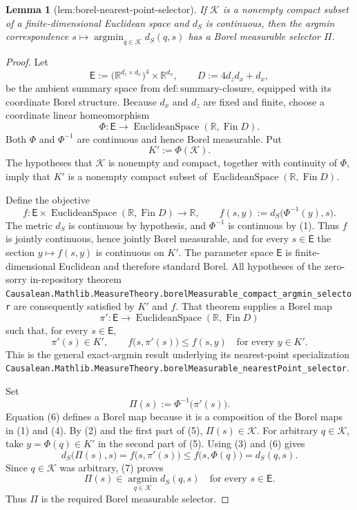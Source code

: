 \documentclass{article}
\newtheorem{lemma}{Lemma}
\begin{document}
\begin{lemma}[lem:borel-nearest-point-selector]\label{lem:borel-nearest-point-selector}
If \(\mathcal K\) is a nonempty compact subset of a finite-dimensional Euclidean space and \(d_S\) is continuous, then the argmin correspondence \(s\mapsto\operatorname*{argmin}_{q\in\mathcal K}d_S(q,s)\) has a Borel measurable selector \(\Pi\).
\end{lemma}
\begin{proof}
Let
\[
\mathsf E:=\bigl(\mathbb R^{d_z\times d_x}\bigr)^4\times\mathbb R^{d_x},
\qquad D:=4d_zd_x+d_x,
\]
be the ambient summary space from \(\mathrm{def:summary\text{-}closure}\), equipped with its coordinate Borel structure.  Because \(d_x\) and \(d_z\) are fixed and finite, choose a coordinate linear homeomorphism
\[
\Phi:\mathsf E\longrightarrow \operatorname{EuclideanSpace}(\mathbb R,\operatorname{Fin}D).
\tag{1}
\]
Both \(\Phi\) and \(\Phi^{-1}\) are continuous and hence Borel measurable.  Put
\[
K':=\Phi(\mathcal K).
\tag{2}
\]
The hypotheses that \(\mathcal K\) is nonempty and compact, together with continuity of \(\Phi\), imply that \(K'\) is a nonempty compact subset of \(\operatorname{EuclideanSpace}(\mathbb R,\operatorname{Fin}D)\).

Define the objective
\[
f:\mathsf E\times\operatorname{EuclideanSpace}(\mathbb R,\operatorname{Fin}D)
\longrightarrow\mathbb R,
\qquad
f(s,y):=d_S\bigl(\Phi^{-1}(y),s\bigr).
\tag{3}
\]
The metric \(d_S\) is continuous by hypothesis, and \(\Phi^{-1}\) is continuous by (1).  Thus \(f\) is jointly continuous, hence jointly Borel measurable, and for every \(s\in\mathsf E\) the section \(y\mapsto f(s,y)\) is continuous on \(K'\).  The parameter space \(\mathsf E\) is finite-dimensional Euclidean and therefore standard Borel.  All hypotheses of the zero-sorry in-repository theorem
\texttt{Causalean.Mathlib.MeasureTheory.borelMeasurable\_compact\_argmin\_selector}
are consequently satisfied by \(K'\) and \(f\).  That theorem supplies a Borel map
\[
\pi':\mathsf E\longrightarrow\operatorname{EuclideanSpace}(\mathbb R,\operatorname{Fin}D)
\tag{4}
\]
such that, for every \(s\in\mathsf E\),
\[
\pi'(s)\in K',
\qquad
f\bigl(s,\pi'(s)\bigr)\le f(s,y)
\quad\text{for every }y\in K'.
\tag{5}
\]
This is the general exact-argmin result underlying its nearest-point specialization
\texttt{Causalean.Mathlib.MeasureTheory.borelMeasurable\_nearestPoint\_selector}.

Set
\[
\Pi(s):=\Phi^{-1}\bigl(\pi'(s)\bigr).
\tag{6}
\]
Equation (6) defines a Borel map because it is a composition of the Borel maps in (1) and (4).  By (2) and the first part of (5), \(\Pi(s)\in\mathcal K\).  For arbitrary \(q\in\mathcal K\), take \(y=\Phi(q)\in K'\) in the second part of (5).  Using (3) and (6) gives
\[
d_S\bigl(\Pi(s),s\bigr)
=f\bigl(s,\pi'(s)\bigr)
\le f\bigl(s,\Phi(q)\bigr)
=d_S(q,s).
\tag{7}
\]
Since \(q\in\mathcal K\) was arbitrary, (7) proves
\[
\Pi(s)\in\operatorname*{argmin}_{q\in\mathcal K}d_S(q,s)
\quad\text{for every }s\in\mathsf E.
\]
Thus \(\Pi\) is the required Borel measurable selector.
\end{proof}
\end{document}

